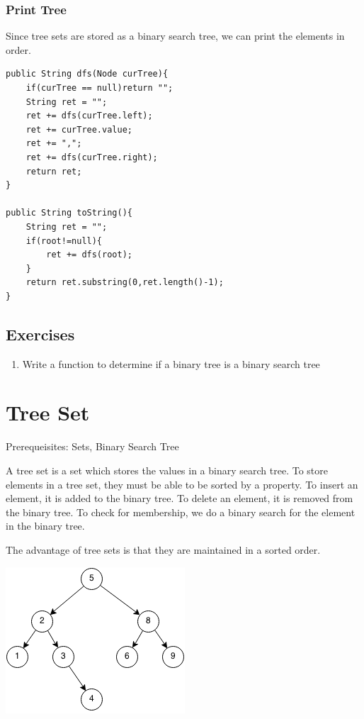 \documentclass[11pt,oneside]{book}
\makeatletter
\def\maxwidth#1{\ifdim\Gin@nat@width>#1 #1\else\Gin@nat@width\fi}
\makeatother
\begin{document}
\subsubsection{Print Tree}

Since tree sets are stored as a binary search tree, we can print the elements in order.

\begin{lstlisting}
public String dfs(Node curTree){
    if(curTree == null)return "";
    String ret = "";
    ret += dfs(curTree.left);
    ret += curTree.value;
    ret += ",";
    ret += dfs(curTree.right);
    return ret;
}
    
public String toString(){
    String ret = "";
    if(root!=null){
        ret += dfs(root);
    }
    return ret.substring(0,ret.length()-1);
}
\end{lstlisting}

\subsection{Exercises}

\begin{enumerate}
\item Write a function to determine if a binary tree is a binary search tree
\end{enumerate}

        \section{ Tree Set }
        

Prerequeisites: Sets, Binary Search Tree



A tree set is a set which stores the values in a binary search tree. To store elements in a tree set, they must be able to be sorted by a property. To insert an element, it is added to the binary tree. To delete an element, it is removed from the binary tree. To check for membership, we do a binary search for the element in the binary tree.

The advantage of tree sets is that they are maintained in a sorted order.

\vspace{5px}\includegraphics[width=\maxwidth{\textwidth}]{bst.png}
\end{document}
